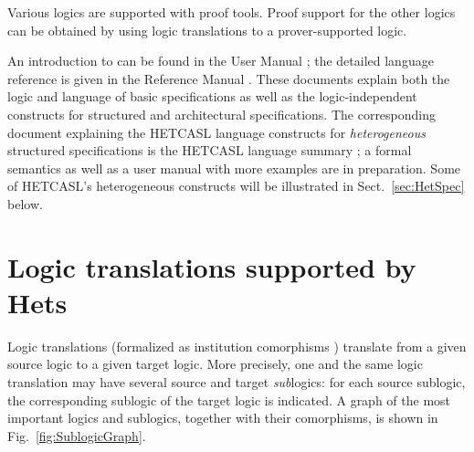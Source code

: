\documentclass{article}
\newcommand{\normalTEXTSC}[2]{{#1\scriptsize#2}}
\newcommand{\HetCASL}{\normalTEXTSC{H}{ET}\normalTEXTSC{C}{ASL}\xspace}
\begin{document}
Various logics are supported with proof tools. Proof support for the
other logics can be obtained by using logic translations to a
prover-supported logic.


An introduction to \CASL can be found in the \CASL User Manual
\cite{CASL-UM}; the detailed language reference is given in
the \CASL Reference Manual \cite{CASL/RefManual}.  These documents
explain both the \CASL logic and language of basic specifications as
well as the logic-independent constructs for structured and
architectural specifications.  The corresponding document explaining the
\HetCASL language constructs for \emph{heterogeneous} structured specifications
is the \HetCASL language summary \cite{Mossakowski04}; a formal
semantics as well as a user manual with more examples are in preparation.
Some of \HetCASL's heterogeneous constructs will be illustrated
in Sect.~\ref{sec:HetSpec} below.

\section{Logic translations supported
by Hets}
\label{comorphisms}

Logic translations (formalized as institution comorphisms
\cite{GoguenRosu02}) translate from a given source logic to a given
target logic. More precisely, one and the same logic translation
may have several source and target \emph{sub}logics: for
each source sublogic, the corresponding sublogic of the target
logic is indicated.
A graph of the most important logics and sublogics, together with their
comorphisms, is shown in Fig.~\ref{fig:SublogicGraph}.
\end{document}
